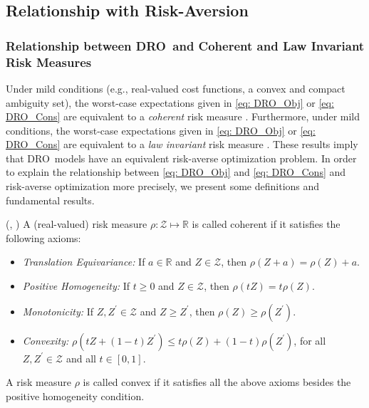 \documentclass[final,onefignum,onetabnum]{class}
\newcommand{\Bs}[1]{\mathbb{#1}} %
\newcommand{\Ts}[1]{\mathbbmtt{#1}} %
\newcommand{\Cs}[1]{\mathcal{#1}} %
\newcommand{\Pspace}[1]{\left( \Xi, \Cs{F}, #1 \right)}
\newcommand{\dro}{DRO}
\begin{document}
\subsection{Relationship with Risk-Aversion}
\label{sec: rev.rel_risk}



\subsubsection{Relationship between \dro\ and Coherent and Law Invariant Risk Measures}
\label{sec: rev.dro_coherent}

Under mild conditions (e.g., real-valued cost functions,  a convex and compact  ambiguity set), the worst-case expectations given in \eqref{eq: DRO_Obj} or \eqref{eq: DRO_Cons} are equivalent to  a {\it coherent} risk measure \citep{artzner1999,rockafellar2007,ruszczynski2006optimization}. 
Furthermore, under mild conditions, the worst-case expectations given in \eqref{eq: DRO_Obj} or \eqref{eq: DRO_Cons} are equivalent to a {\it law invariant} risk measure \cite{shapiro2017DRSP}.  These results imply that \dro\ models have an equivalent risk-averse optimization problem. In order to explain the relationship between \eqref{eq: DRO_Obj} and  \eqref{eq: DRO_Cons}  and risk-averse optimization more precisely, we  present some definitions and fundamental results. 

\begin{definition}{(\citet[Definition~2.4]{artzner1999}, \citet[Definition~6.4]{shapiro2014SP})}
\label{def: rev.coherent}
A (real-valued) risk measure $\rho: \Cs{Z} \mapsto \Bs{R}$ is called coherent if it  satisfies the following axioms: 
\begin{itemize}
    \item {\it Translation Equivariance:}  If $a \in \Bs{R}$ and $Z \in \Cs{Z}$, then $\rho(Z+a)=\rho(Z)+a$.
	\item {\it Positive Homogeneity:} If $t \ge 0$ and $Z \in \Cs{Z}$, then $\rho(tZ)=t\rho(Z)$. 
	\item {\it Monotonicity:} If $Z, Z^{\prime} \in \Cs{Z}$ and $Z \ge Z^{\prime}$, then $\rho(Z) \ge \rho(Z^{\prime})$.
	\item {\it Convexity:} $\rho\left( tZ+(1-t)Z^{\prime} \right) \le t\rho(Z) + (1-t) \rho(Z^{\prime})$, for all $Z, Z^{\prime} \in \Cs{Z}$ and all $t \in [0,1]$.
\end{itemize}
A risk measure $\rho$ is called convex if it satisfies all the above axioms besides the  positive homogeneity condition. 
\end{definition}
\end{document}
